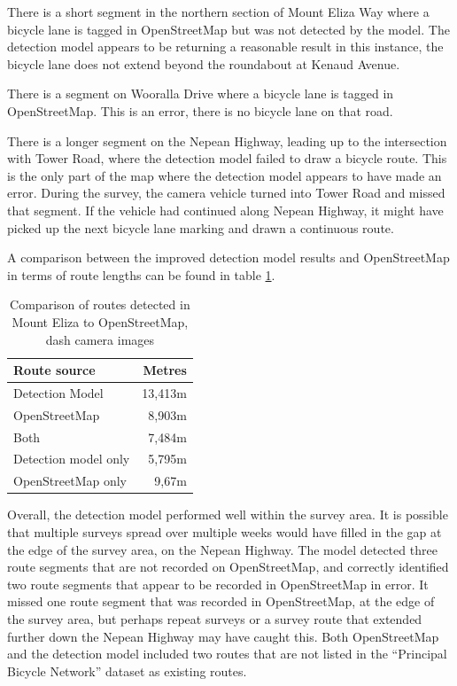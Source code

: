 \documentclass[11pt,twoside]{report}
\begin{document}
There is a short segment in the northern section of Mount Eliza Way where a bicycle lane is tagged in OpenStreetMap but was not detected by the model.  The detection model appears to be returning a reasonable result in this instance, the bicycle lane does not extend beyond the roundabout at Kenaud Avenue.

There is a segment on Wooralla Drive where a bicycle lane is tagged in OpenStreetMap.  This is an error, there is no bicycle lane on that road.

There is a longer segment on the Nepean Highway, leading up to the intersection with Tower Road, where the detection model failed to draw a bicycle route.  This is the only part of the map where the detection model appears to have made an error.  During the survey, the camera vehicle turned into Tower Road and missed that segment.  If the vehicle had continued along Nepean Highway, it might have picked up the next bicycle lane marking and drawn a continuous route.

A comparison between the improved detection model results and OpenStreetMap in terms of route lengths can be found in table \ref{table_metres_rq3_me}.

\begin{table}[h]
\centering
\begin{tabular}{|l|r||}
\hline
\textbf{Route source} & \textbf{Metres} \\
\hline
Detection Model & 13,413m \\
OpenStreetMap & 8,903m \\
Both & 7,484m \\
Detection model only & 5,795m \\
OpenStreetMap only & 9,67m \\
\hline
\end{tabular}
\caption{Comparison of routes detected in Mount Eliza to OpenStreetMap, dash camera images}
\label{table_metres_rq3_me}
\end{table}

Overall, the detection model performed well within the survey area.  It is possible that multiple surveys spread over multiple weeks would have filled in the gap at the edge of the survey area, on the Nepean Highway.  The model detected three route segments that are not recorded on OpenStreetMap, and correctly identified two route segments that appear to be recorded in OpenStreetMap in error.  It missed one route segment that was recorded in OpenStreetMap, at the edge of the survey area, but perhaps repeat surveys or a survey route that extended further down the Nepean Highway may have caught this.   Both OpenStreetMap and the detection model included two routes that are not listed in the ``Principal Bicycle Network'' dataset as existing routes.
\end{document}
